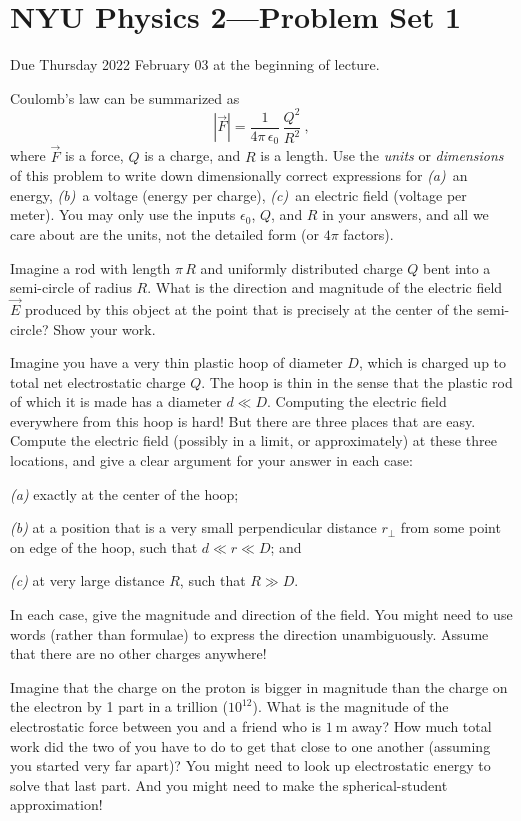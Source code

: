 \documentclass[12pt]{article}
\begin{document}
\section*{NYU Physics 2---Problem Set 1}

Due Thursday 2022 February 03 at the beginning of lecture.

\startproblem%
Coulomb's law can be summarized as
\begin{equation}
  |\vec{F}| = \frac{1}{4\pi\,\epsilon_0}\,\frac{Q^2}{R^2}~,
\end{equation}
where $\vec{F}$ is a force, $Q$ is a charge, and $R$ is a length.
Use the \emph{units} or \emph{dimensions} of this problem to write
down dimensionally correct expressions for
\textsl{(a)}~an energy,
\textsl{(b)}~a voltage (energy per charge),
\textsl{(c)}~an electric field (voltage per meter).
You may only use the inputs $\epsilon_0$, $Q$, and $R$ in your answers, and all
we care about are the units, not the detailed form (or $4\pi$ factors).

\startproblem%
Imagine a rod with length $\pi\,R$ and uniformly distributed charge
$Q$ bent into a semi-circle of radius $R$.  What is the direction and
magnitude of the electric field $\vec{E}$ produced by this object
at the point that is precisely at the center of the semi-circle?
Show your work.

\startproblem%
Imagine you have a very thin plastic hoop of diameter $D$, which is
charged up to total net electrostatic charge $Q$.
The hoop is thin in the sense that the plastic rod of which it is
made has a diameter $d\ll D$.
Computing the electric field everywhere from this hoop is hard!
But there are three places that are easy.
Compute the electric field (possibly in a limit, or approximately)
at these three locations, and give a clear argument for your answer
in each case:

\textsl{(a)} exactly at the center of the hoop;

\textsl{(b)} at a position that is a very small perpendicular
distance $r_\perp$ from some point on edge of the hoop,
such that $d\ll r\ll D$; and

\textsl{(c)} at very large distance $R$, such that $R\gg D$.

In each case, give the magnitude and direction of the field. You might
need to use words (rather than formulae) to express the direction
unambiguously.
Assume that there are no other charges anywhere!

\startproblem%
Imagine that the charge on the proton is bigger in magnitude than the
charge on the electron by 1 part in a trillion ($10^{12}$).  What is
the magnitude of the electrostatic force between you and a friend who
is $1~\mathrm{m}$ away?  How much total work did the two of you have
to do to get that close to one another (assuming you started very far
apart)? You might need to look up electrostatic energy to solve that last part.
And you might need to make the spherical-student approximation!
\end{document}
